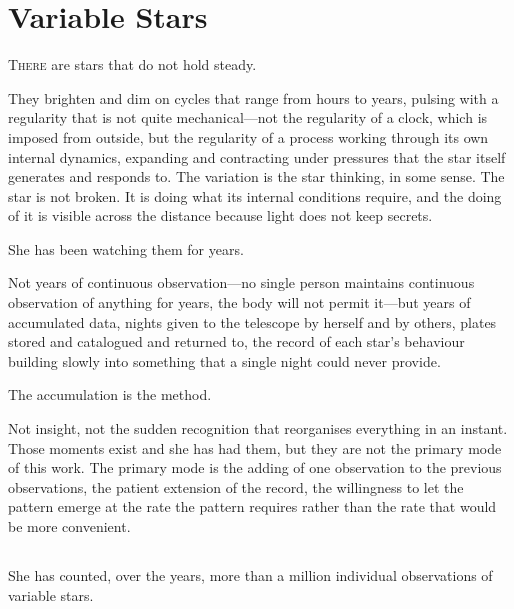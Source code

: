 
\chapter{Variable Stars}


\lettrine{T}{here} are stars that do not hold steady.

They brighten and dim on cycles that range from hours
to years, pulsing with a regularity that is not quite
mechanical---not the regularity of a clock, which is
imposed from outside, but the regularity of a process
working through its own internal dynamics, expanding
and contracting under pressures that the star itself
generates and responds to. The variation is the star
thinking, in some sense. The star is not broken. It
is doing what its internal conditions require, and
the doing of it is visible across the distance because
light does not keep secrets.

She has been watching them for years.

Not years of continuous observation---no single person
maintains continuous observation of anything for years,
the body will not permit it---but years of accumulated
data, nights given to the telescope by herself and by
others, plates stored and catalogued and returned to,
the record of each star's behaviour building slowly
into something that a single night could never provide.

The accumulation is the method.

Not insight, not the sudden recognition that reorganises
everything in an instant. Those moments exist and she
has had them, but they are not the primary mode of this
work. The primary mode is the adding of one observation
to the previous observations, the patient extension of
the record, the willingness to let the pattern emerge
at the rate the pattern requires rather than the rate
that would be more convenient.

\section{}

She has counted, over the years, more than a million
individual observations of variable stars.

